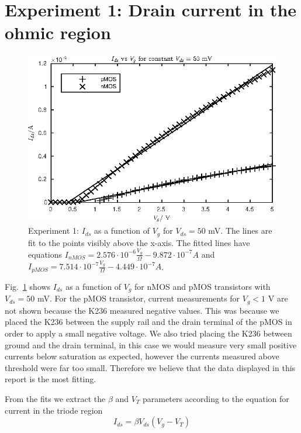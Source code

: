 

\newcommand{\reffig}[1]{Fig.~\ref{#1}}



\newpage
\section{Experiment 1: Drain current in the ohmic region}
\begin{figure}
    \center
    \includegraphics{ex1.eps}
    \caption{Experiment 1: \(I_{ds}\) as a function of \(V_g\) for \(V_{ds} = 50\) mV. The lines are fit to the points
        visibly above the x-axis. The fitted lines have equations \(I_{nMOS} = 2.576\cdot10^{-6}\frac{V_g}{\Omega}-9.872\cdot10^{-7} A\)
    and \(I_{pMOS} = 7.514\cdot10^{-7}\frac{V_g}{\Omega}-4.449\cdot10^{-7} A\).}
    \label{fig:ex1}
\end{figure}
Fig.~\ref{fig:ex1} shows \(I_{ds}\) as a function of \(V_g\) for nMOS and pMOS transistors with \(V_{ds} = 50\) mV.
For the pMOS transistor, current measurements for \(V_g < 1\) V are not shown because the K236 measured negative
values. This was because we placed the K236 between the supply rail and the drain terminal of the pMOS in order to
apply a small negative voltage. We also tried placing the K236 between ground and the drain terminal, in this case
we would measure very small positive currents below saturation as expected, however the currents measured above threshold
were far too small. Therefore we believe that the data displayed in this report is the most fitting.

From the fits we extract the \(\beta\) and \(V_T\) parameters according to the equation for current in the triode region
\begin{equation*}
    I_{ds} = \beta V_{ds} \left(V_g-V_T\right)
\end{equation*}

